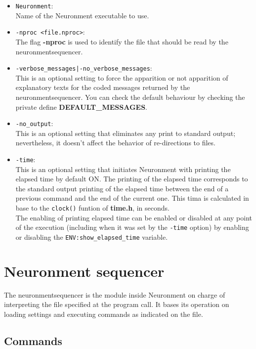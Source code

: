 \begin{itemize}
  \item \texttt{Neuronment}:\\
  Name of the Neuronment executable to use.
  \item \texttt{-nproc <file.nproc>}:\\
  The flag \textbf{-nproc} is used to identify the  file that should be read by the \gls{neuronmentsequencer}.
  \item \texttt{-verbose\_messages|-no\_verbose\_messages}:\\
  This is an optional setting to force the apparition or not apparition of explanatory texts for the coded messages returned by the \gls{neuronmentsequencer}. You can check the default behaviour by checking the private define \textbf{DEFAULT\_MESSAGES}. \lotharcl
  \item \texttt{-no\_output}:\\
  This is an optional setting that eliminates any print to standard output; nevertheless, it doesn't affect the behavior of re-directions to files.
  \item \texttt{-time}:\\
  This is an optional setting that initiates Neuronment with printing the elapsed time by default ON. The printing of the elapsed time corresponds to the standard output printing of the elapsed time between the end of a previous command and the end of the current one. This tima is calculated in base to the \texttt{clock()} funtion of \textbf{time.h}, in seconds.\\
  The enabling of printing elapsed time can be enabled or disabled at any point of the execution (including when it was set by the \texttt{-time} option) by enabling or disabling the \texttt{ENV:show\_elapsed\_time} variable. \lotharcl
\end{itemize}

\section{Neuronment sequencer}

The \gls{neuronmentsequencer} is the module inside Neuronment on charge of interpreting the  file specified at the program call. It bases its operation on loading settings and executing commands as indicated on the  file.

\subsection{Commands}

